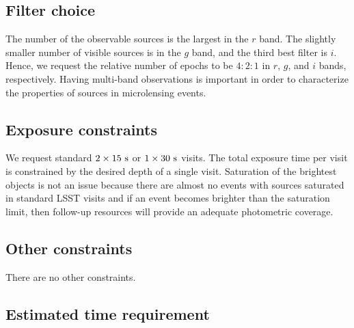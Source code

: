 \documentclass[12pt,letterpaper]{article}
\begin{document}
\subsection{Filter choice}

The number of the observable sources is the largest in the $r$ band.  
The slightly smaller number of visible sources is in the $g$ band, and 
the third best filter is $i$.  Hence, we request 
the relative number of epochs to be $4:2:1$ in $r$, $g$, and $i$ bands, respectively.  
Having multi-band observations is important in order to characterize 
the properties of sources in microlensing events. %

\subsection{Exposure constraints}

We request standard $2\times15~{\rm s}$ or $1\times30~{\rm s}$ visits.  
The total exposure time per visit is constrained by the desired depth of a single visit.  
Saturation of the brightest objects is not an issue because there are almost 
no events with sources saturated in standard LSST visits and if an event 
becomes brighter than the saturation limit, then follow-up resources 
will provide an adequate photometric coverage.


\subsection{Other constraints}

There are no other constraints.


\subsection{Estimated time requirement}
\end{document}
